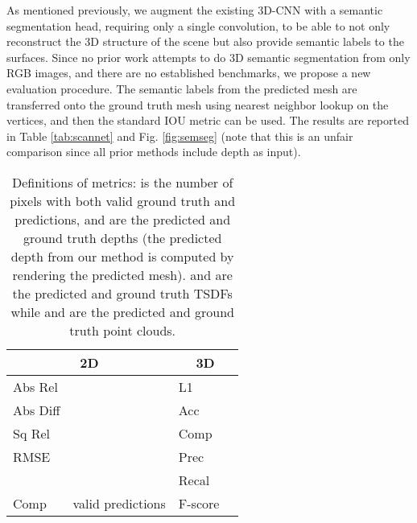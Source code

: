 \documentclass[runningheads]{llncs}
\begin{document}
As mentioned previously, we augment the existing 3D-CNN with a semantic segmentation head, requiring only a single  convolution, to be able to not only reconstruct the 3D structure of the scene but also provide semantic labels to the surfaces. Since no prior work attempts to do 3D semantic segmentation from only RGB images, and there are no established benchmarks, we propose a new evaluation procedure. The semantic labels from the predicted mesh are transferred onto the ground truth mesh using nearest neighbor lookup on the vertices, and then the standard IOU metric can be used. The results are reported in Table \ref{tab:scannet} and Fig. \ref{fig:semseg} (note that this is an unfair comparison since all prior methods include depth as input).




\begin{table}[]
\centering
\caption{Definitions of metrics:  is the number of pixels with both valid ground truth and predictions,  and  are the predicted and ground truth depths (the predicted depth from our method is computed by rendering the predicted mesh).  and  are the predicted and ground truth TSDFs while  and  are the predicted and ground truth point clouds.
}
\begin{tabular}{llll}
\hline
\multicolumn{2}{c}{2D} & \multicolumn{2}{c}{3D} \\
\hline
Abs Rel  &  & L1 & \\
Abs Diff &  & Acc &  \\
Sq Rel   &  & Comp &  \\
RMSE     &  & Prec &  \\
 &  & Recal &  \\
Comp &  valid predictions & F-score &  \\
\hline
\end{tabular}
\label{tab:metric_defs}
\end{table}
\end{document}
